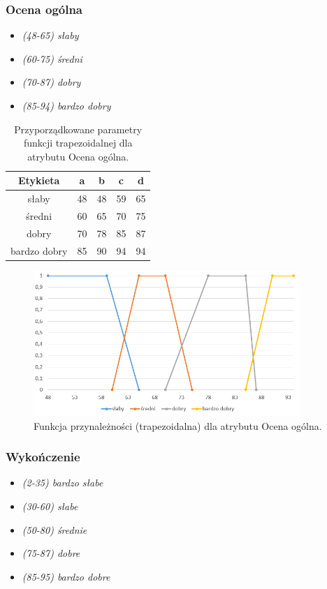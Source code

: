 \documentclass{classrep}
\begin{document}
	\newpage
	\subsubsection{Ocena ogólna}
	\begin{itemize}
		\item \textsl{(48-65) słaby}
		\item \textsl{(60-75) średni}
		\item \textsl{(70-87) dobry}
		\item \textsl{(85-94) bardzo dobry}
	\end{itemize}
	
	\begin{table}[h!]
		\centering
		\begin{tabular} {c c c c c}
			\hline
			\textbf{Etykieta} & \textbf{a} & \textbf{b} & \textbf{c} & \textbf{d} \\ [0.5ex] 
			\hline	
			\hline 
			słaby & 48 & 48 & 59 & 65  \\
			średni & 60 & 65 & 70 & 75  \\
			dobry & 70 & 78 & 85 & 87  \\
			bardzo dobry & 85 & 90 & 94 & 94  \\
			\hline
		\end{tabular}
		\caption{Przyporządkowane parametry funkcji trapezoidalnej dla atrybutu  Ocena ogólna. }
		\label{tabelaOverall}
	\end{table}
	
	\begin{figure}[h!]
		\centering
		\includegraphics[width=0.9\textwidth]{zmienne/4.png}
		\caption{Funkcja przynależności (trapezoidalna) dla atrybutu Ocena ogólna.}
		\label{wykresOverall}
	\end{figure}
	
	
	\newpage
	\subsubsection{Wykończenie}
	\begin{itemize}
		\item \textsl{(2-35) bardzo słabe}
		\item \textsl{(30-60) słabe}
		\item \textsl{(50-80) średnie}
		\item \textsl{(75-87) dobre}
		\item \textsl{(85-95) bardzo dobre}
	\end{itemize}
	
\end{document}
